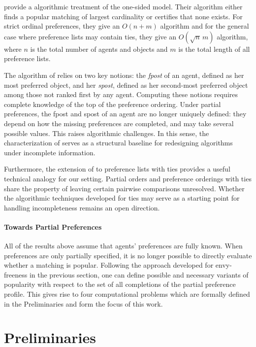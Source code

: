 \documentclass{article}
\begin{document}
\cite{abraham2007popular} provide a algorithmic treatment of the one-sided model. 
Their algorithm either finds a popular matching of largest cardinality or certifies that none exists. 
For strict ordinal preferences, they give an $O(n+m)$ algorithm and for the general case where preference lists may contain ties, they give an $O(\sqrt{n}\, m)$ algorithm, where $n$ is the total number of agents and objects and $m$ is the total length of all preference lists.

The algorithm of \cite{abraham2007popular} relies on two key notions: the \emph{fpost} of an agent, defined as her most preferred object, and her \emph{spost}, defined as her second-most preferred object among those not ranked first by any agent. 
Computing these notions requires complete knowledge of the top of the preference ordering. 
Under partial preferences, the fpost and spost of an agent are no longer uniquely defined: they depend on how the missing preferences are completed, and may take several possible values. 
This raises algorithmic challenges.
In this sense, the characterization of \cite{abraham2007popular} serves as a structural baseline for redesigning algorithms under incomplete information.

Furthermore, the extension of \cite{abraham2007popular} to preference lists with ties provides a useful technical analogy for our setting.
Partial orders and preference orderings with ties share the property of leaving certain pairwise comparisons unresolved.
Whether the algorithmic techniques developed for ties may serve as a starting point for handling incompleteness remains an open direction.

\paragraph{Towards Partial Preferences}

All of the results above assume that agents' preferences are fully known. 
When preferences are only partially specified, it is no longer possible to directly evaluate whether a matching is popular. 
Following the approach developed for envy-freeness in the previous section, one can define possible and necessary variants of popularity with respect to the set of all completions of the partial preference profile. 
This gives rise to four computational problems which are formally defined in the Preliminaries and form the focus of this work.

\section{Preliminaries}
\end{document}
